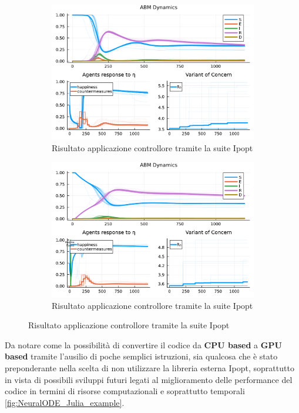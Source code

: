 \begin{figure}[!hb]
	\centering
	\begin{subfigure}[b]{\textwidth}
		\centering
		\includegraphics[width=\textwidth]{img/SocialNetworkABM_IPOPT_CONTROL.pdf}
		\caption{Risultato applicazione controllore tramite la suite Ipopt}
		\label{fig:ipopt_res1}
	\end{subfigure}
	\hfill
	\begin{subfigure}[b]{\textwidth}
		\centering
		\includegraphics[width=\textwidth]{img/SocialNetworkABM_IPOPT_ALL.pdf}
		\caption{Risultato applicazione controllore tramite la suite Ipopt}
		\label{fig:ipopt_res2}
	\end{subfigure}
\end{figure}

Da notare come la possibilità di convertire il codice da \textbf{CPU based} a \textbf{GPU based} tramite
l'ausilio di poche semplici istruzioni, sia qualcosa che è stato preponderante nella scelta di non 
utilizzare la libreria esterna Ipopt, soprattutto in vista di possibili sviluppi futuri legati al miglioramento 
delle performance del codice in termini di risorse computazionali e soprattutto temporali \ref{fig:NeuralODE_Julia_example}.

